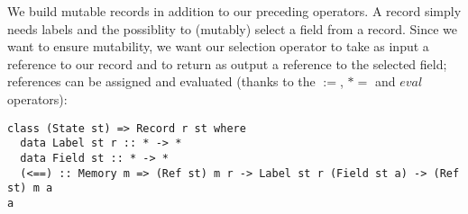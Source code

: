 We build mutable records in addition to our preceding 
 operators. A record simply needs labels and the possiblity 
to (mutably) select a field from a record. Since we want to 
ensure mutability, we want our selection operator to take as 
input a reference to our record and to return as output a 
reference to the selected field; references can be assigned and 
evaluated (thanks to the $:=$, $*=$ and $eval$ operators):

\begin{lstlisting}
class (State st) => Record r st where
  data Label st r :: * -> *
  data Field st :: * -> *
  (<==) :: Memory m => (Ref st) m r -> Label st r (Field st a) -> (Ref st) m a
a\end{lstlisting}
